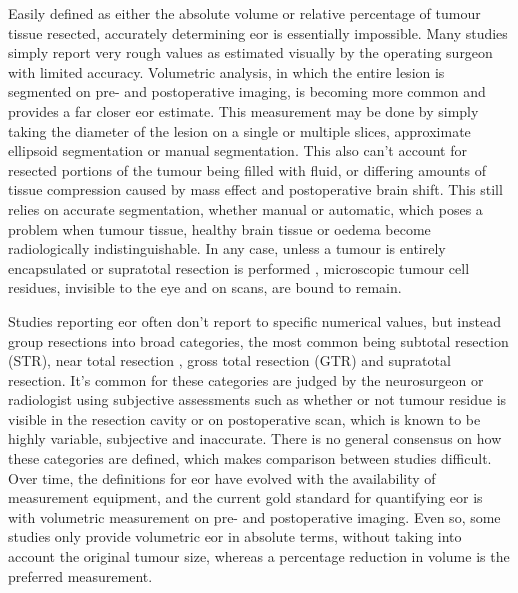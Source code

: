 Easily defined as either the absolute volume or relative percentage of tumour tissue resected, accurately determining \gls{eor} is essentially impossible.
Many studies simply report very rough values as estimated visually by the operating surgeon with limited accuracy\autocite{Martino2013}. 
Volumetric analysis, in which the entire lesion is segmented on pre- and postoperative imaging, is becoming more common and provides a far closer \gls{eor} estimate.
This measurement may be done by simply taking the diameter of the lesion on a single or multiple slices, approximate ellipsoid segmentation or manual segmentation\autocite{Albuquerque2021}.
This also can't account for resected portions of the tumour being filled with fluid, or differing amounts of tissue compression caused by mass effect and postoperative brain shift.
This still relies on accurate segmentation, whether manual or automatic, which poses a problem when tumour tissue, healthy brain tissue or oedema become radiologically indistinguishable.
In any case, unless a tumour is entirely encapsulated  or supratotal resection is performed , microscopic tumour cell residues, invisible to the eye and on scans, are bound to remain.

Studies reporting \gls{eor} often don't report to specific numerical values, but instead group resections into broad categories, the most common being subtotal resection (STR), near total resection , gross total resection (GTR) and supratotal resection.
It's common for these categories are judged by the neurosurgeon or radiologist using subjective assessments such as whether or not tumour residue is visible in the resection cavity or on postoperative scan, which is known to be highly variable, subjective and inaccurate.\autocite{Sezer2020,Lau2018}
There is no general consensus on how these categories are defined, which makes comparison between studies difficult.
Over time, the definitions for \gls{eor} have evolved with the availability of measurement equipment, and the current gold standard for quantifying \gls{eor} is with volumetric measurement on pre- and postoperative imaging.\autocite{Rincon-Torroella2019}
Even so, some studies only provide volumetric \gls{eor} in absolute terms, without taking into account the original tumour size, whereas a percentage reduction in volume is the preferred measurement.\autocite{Ius2012,Rincon-Torroella2019,Smith2008} 

